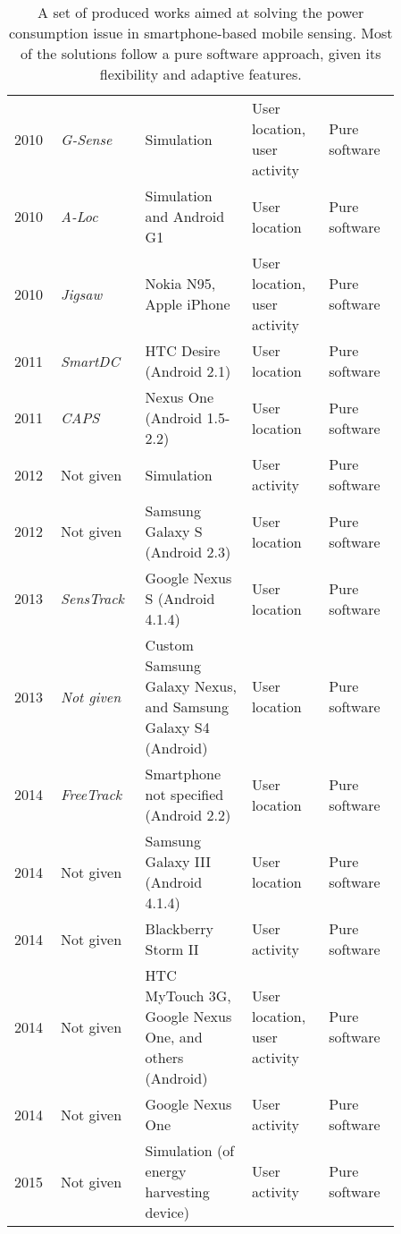 \begin{table*}
\begin{tabular}{C{0.09\linewidth}C{0.17\linewidth}C{0.25\linewidth}C{0.18\linewidth}C{0.17\linewidth}}
    \cmidrule(l){1-5}
    \cite{Perez2010} 2010 & \emph{G-Sense} & Simulation & User location, user activity & Pure software \\
    \cmidrule(l){1-5}
    \cite{Lin2010} 2010 & \emph{A-Loc} & Simulation and Android G1 & User location & Pure software \\
    \cmidrule(l){1-5}
    \cite{Lu2010} 2010 & \emph{Jigsaw} & Nokia N95, Apple iPhone & User location, user activity & Pure software \\
    \cmidrule(l){1-5}
    \cite{Chon2011} 2011 & \emph{SmartDC} & HTC Desire (Android 2.1) & User location & Pure software \\
    \cmidrule(l){1-5}
    \cite{Paek2011} 2011 & \emph{CAPS} & Nexus One (Android 1.5-2.2) & User location & Pure software \\
    \cmidrule(l){1-5}
    \cite{Srinivasan2012} 2012 & Not given & Simulation & User activity & Pure software \\
    \cmidrule(l){1-5}
    \cite{Perez-Torres2012} 2012 & Not given & Samsung Galaxy S (Android 2.3) &  User location & Pure software \\
    \cmidrule(l){1-5}
    \cite{Zhang2013} 2013 & \emph{SensTrack} & Google Nexus S (Android 4.1.4) & User location & Pure software \\
    \cmidrule(l){1-5}
    \cite{Mazilu2013} 2013 & \emph{Not given} & Custom Samsung Galaxy Nexus, and Samsung Galaxy S4 (Android) & User location & Pure software \\
    \cmidrule(l){1-5}
    \cite{Chon2014} 2014 & \emph{FreeTrack} & Smartphone not specified (Android 2.2) & User location & Pure software \\
    \cmidrule(l){1-5}
    \cite{Man2014} 2014 & Not given & Samsung Galaxy III (Android 4.1.4) & User location & Pure software \\
    \cmidrule(l){1-5}
    \cite{Yurur2014} 2014 & Not given & Blackberry Storm II & User activity & Pure software \\
    \cmidrule(l){1-5}
    \cite{Donohoo2014} 2014 & Not given & HTC MyTouch 3G, Google Nexus One, and others (Android) & User location, user activity & Pure software \\
    \cmidrule(l){1-5}
    \cite{AlvarezDeLaConcepcion2014,Morillo2015} 2014 & Not given & Google Nexus One & User activity & Pure software \\
    \cmidrule(l){1-5}
    \cite{Khalifa2015} 2015 & Not given & Simulation (of energy harvesting device) & User activity & Pure software \\
    \bottomrule
    \end{tabular}
    \protect\caption{A set of produced works aimed at solving the power consumption issue in smartphone-based mobile sensing. Most of the solutions follow a pure software approach, given its flexibility and adaptive features.\label{tab:related-work}}
    
\end{table*}
